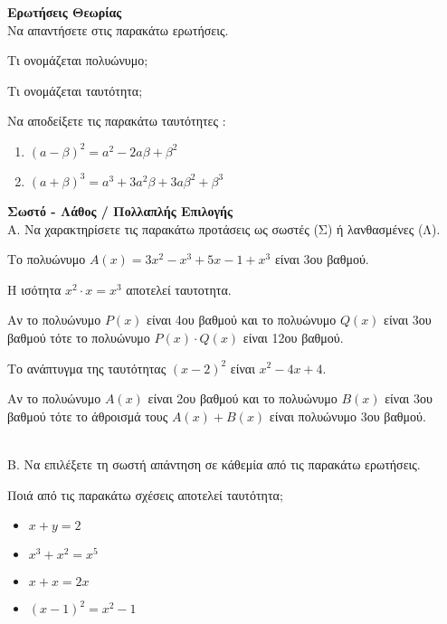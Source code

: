 \documentclass[ektypwsh]{diag-xelatex}
\begin{document}
\thewria
\begin{thema}
\item \textbf{Ερωτήσεις Θεωρίας}\\
Να απαντήσετε στις παρακάτω ερωτήσεις.
\begin{rlist}
\item Τι ονομάζεται πολυώνυμο;
\item Τι ονομάζεται ταυτότητα;
\item Να αποδείξετε τις παρακάτω ταυτότητες :
\begin{enumerate}[itemsep=0mm]
\item $ (a-\beta)^2=a^2-2a\beta+\beta^2 $
\item $ (a+\beta)^3=a^3+3a^2\beta+3a\beta^2+\beta^3 $
\end{enumerate}
\end{rlist}
\item \textbf{Σωστό - Λάθος / Πολλαπλής Επιλογής}\\
Α. Να χαρακτηρίσετε τις παρακάτω προτάσεις ως σωστές (Σ) ή λανθασμένες (Λ).
\begin{rlist}
\item Το πολυώνυμο $ A(x)=3x^2-x^3+5x-1+x^3 $ είναι 3ου βαθμού.
\item Η ισότητα $ x^2\cdot x=x^3 $ αποτελεί ταυτοτητα.
\item Αν το πολυώνυμο $ P(x) $ είναι 4ου βαθμού και το πολυώνυμο $ Q(x) $ είναι 3ου βαθμού τότε το πολυώνυμο $ P(x)\cdot Q(x) $ είναι 12ου βαθμού.
\item Το ανάπτυγμα της ταυτότητας $ (x-2)^2 $ είναι $ x^2-4x+4 $.
\item Αν το πολυώνυμο $ A(x) $ είναι 2ου βαθμού και το πολυώνυμο $ B(x) $ είναι 3ου βαθμού τότε το άθροισμά τους $ A(x)+B(x) $ είναι πολυώνυμο 3ου βαθμού.
\end{rlist}\\
Β. Να επιλέξετε τη σωστή απάντηση σε κάθεμία από τις παρακάτω ερωτήσεις.
\begin{rlist}
\item Ποιά από τις παρακάτω σχέσεις αποτελεί ταυτότητα;
\begin{multicols}{4}
\begin{itemize}
\item $ x+y=2 $
\item $ x^3+x^2=x^5 $
\item $ x+x=2x $
\item $ (x-1)^2=x^2-1 $
\end{itemize}

\end{multicols}
\end{rlist}
\end{thema}
\end{document}
